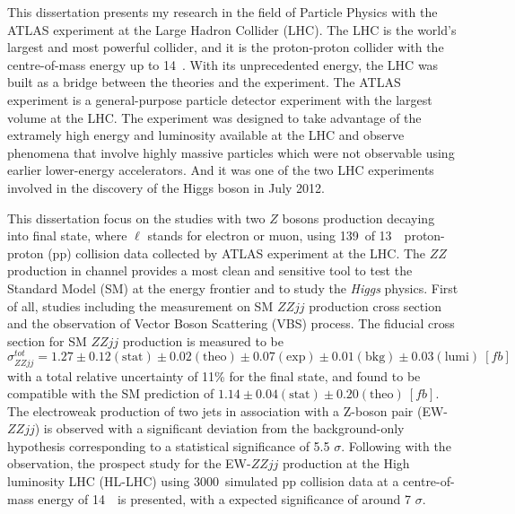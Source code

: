 \begin{enabstract}
This dissertation presents my research in the field of Particle Physics with the ATLAS experiment at the Large Hadron Collider (LHC). 
The LHC is the world's largest and most powerful collider, and it is the proton-proton collider with the centre-of-mass energy up to 14~\tev.
With its unprecedented energy, the LHC was built as a bridge between the theories and the experiment.
The ATLAS experiment is a general-purpose particle detector experiment with the largest volume at the LHC.
The experiment was designed to take advantage of the extramely high energy and luminosity available at the LHC 
and observe phenomena that involve highly massive particles which were not observable using earlier lower-energy accelerators.
And it was one of the two LHC experiments involved in the discovery of the Higgs boson in July 2012.

This dissertation focus on the studies with two $Z$ bosons production decaying into \llll final state, where $\ell$ stands for electron or muon, using 139~\ifb of 13~\tev~proton-proton (pp) collision data collected by ATLAS experiment at the LHC.
The $ZZ$ production in \llll channel provides a most clean and sensitive tool to test the Standard Model (SM) at the energy frontier and to study the \textit{Higgs} physics.
First of all, studies including the measurement on SM $ZZjj$ production cross section and the observation of Vector Boson Scattering (VBS) process.
The fiducial cross section for SM $ZZjj$ production is measured to be 
    $\sigma_{ZZjj}^{tot} = 1.27 \pm 0.12 (\mathrm{stat}) \pm 0.02 (\mathrm{theo}) \pm 0.07 (\mathrm{exp}) \pm 0.01 (\mathrm{bkg}) \pm 0.03 (\mathrm{lumi})~[fb]$
    with a total relative uncertainty of 11\% for the \llll final state, and found to be compatible with the SM prediction of $1.14 \pm 0.04 (\mathrm{stat}) \pm 0.20 (\mathrm{theo})~[fb]$.
The electroweak production of two jets in association with a Z-boson pair (EW-$ZZjj$) is observed with
a significant deviation from the background-only hypothesis corresponding to a statistical significance of 5.5 $\sigma$.
Following with the observation, the prospect study for the EW-$ZZjj$ production at the High luminosity LHC (HL-LHC) using 3000~\ifb simulated pp collision data at a centre-of-mass energy of 14~\tev~is presented,
with a expected significance of around 7 $\sigma$.


\end{enabstract}
